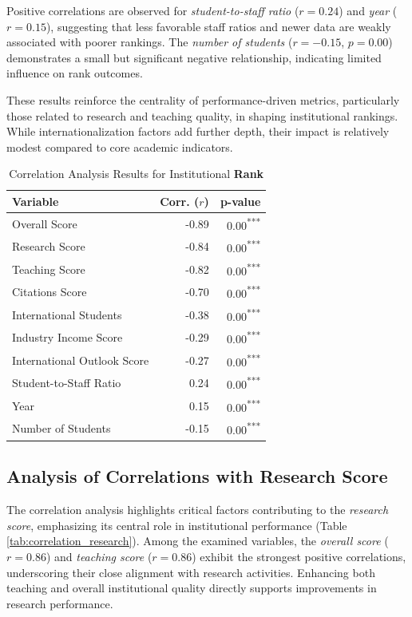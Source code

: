 \documentclass[conference]{IEEEtran}
\begin{document}
Positive correlations are observed for \textit{student-to-staff ratio} ($r = 0.24$) and \textit{year} ($r = 0.15$), suggesting that less favorable staff ratios and newer data are weakly associated with poorer rankings. The \textit{number of students} ($r = -0.15$, $p = 0.00$) demonstrates a small but significant negative relationship, indicating limited influence on rank outcomes.

These results reinforce the centrality of performance-driven metrics, particularly those related to research and teaching quality, in shaping institutional rankings. While internationalization factors add further depth, their impact is relatively modest compared to core academic indicators.

\begin{table}[h!]
	\centering
	\caption{Correlation Analysis Results for Institutional \textbf{Rank}}
	\label{tab:correlation_rank}
	\begin{tabular}{|l|r|r|}
		\hline
		\textbf{Variable} & \textbf{Corr. ($r$)} & \textbf{p-value} \\
		\hline
		Overall Score & -0.89 & 0.00\textsuperscript{***} \\
		Research Score & -0.84 & 0.00\textsuperscript{***} \\
		Teaching Score & -0.82 & 0.00\textsuperscript{***} \\
		Citations Score & -0.70 & 0.00\textsuperscript{***} \\
		International Students & -0.38 & 0.00\textsuperscript{***} \\
		Industry Income Score & -0.29 & 0.00\textsuperscript{***} \\
		International Outlook Score & -0.27 & 0.00\textsuperscript{***} \\
		Student-to-Staff Ratio & 0.24 & 0.00\textsuperscript{***} \\
		Year & 0.15 & 0.00\textsuperscript{***} \\
		Number of Students & -0.15 & 0.00\textsuperscript{***} \\
		\hline
	\end{tabular}
\end{table}


\subsection{Analysis of Correlations with Research Score}

The correlation analysis highlights critical factors contributing to the \textit{research score}, emphasizing its central role in institutional performance (Table \ref{tab:correlation_research}). Among the examined variables, the \textit{overall score} ($r = 0.86$) and \textit{teaching score} ($r = 0.86$) exhibit the strongest positive correlations, underscoring their close alignment with research activities. Enhancing both teaching and overall institutional quality directly supports improvements in research performance.
\end{document}
